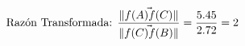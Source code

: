 \documentclass[preview]{standalone}
\begin{document}
\begin{align*}
\special{dvisvgm:raw <g id='unique000'>}\text{Razón Transformada: } \frac{\|\vec{f(A)f(C)}\|}{\|\vec{f(C)f(B)}\|} = \frac{5.45}{2.72} = 2\special{dvisvgm:raw </g>}
\end{align*}
\end{document}
